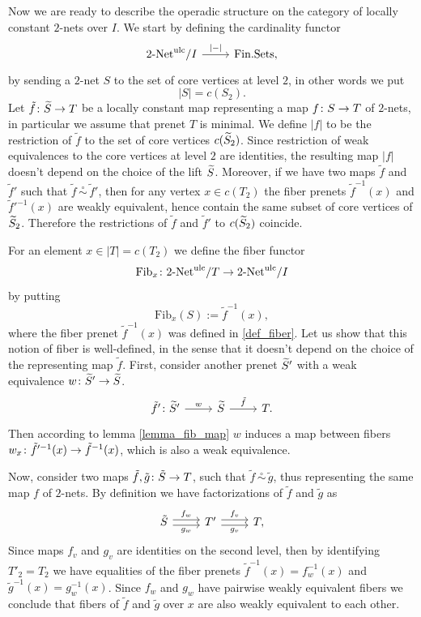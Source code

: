 \documentclass[letterpaper,12pt,leqno]{article}
\numberwithin{equation}{theorem}
\def\Fib{\mathrm{Fib}}
\def\Net{\textrm{-}\mathrm{Net}}
\def\simo{\,\mathop{\sim}\limits^\circ\,}
\def\ulc{\mathrm{ulc}}
\begin{document}
\begin{nparagraph}
Now we are ready to describe the operadic structure on the category of locally constant $2$-nets over $I$.
We start by defining the cardinality functor
$$
\begin{tikzcd}
2\Net^\ulc / I \ar[r, "|-|"] & \FSets,
\end{tikzcd}
$$
by sending a $2$-net $S$ to the set of core vertices at level $2$, in other words we put
$$
|S| = c(S_2).
$$
Let $\tilde f\colon \widetilde S \to T$ be a locally constant map representing a map $f\colon S \to T$ of $2$-nets, in particular we assume that prenet $T$ is minimal. We define
$|f|$ to be the restriction of $\tilde f$ to the set of core vertices $c(\widetilde S_2)$. Since restriction of weak equivalences to the core vertices at level $2$ are identities,
the resulting map $|f|$ doesn't depend on the choice of the lift $\widetilde S$. Moreover, if we have two maps $\tilde f$ and $\tilde f'$ such that $\tilde f \simo \tilde f'$, then
for any vertex $x \in c(T_2)$ the fiber prenets $\tilde f^{-1}(x)$ and $\tilde f'^{-1}(x)$ are weakly equivalent, hence contain the same subset of core vertices of $\widetilde S_2$.
Therefore the restrictions of $\tilde f$ and $\tilde f'$ to $c(\widetilde S_2)$ coincide.

For an element $x \in |T| = c(T_2)$ we define
the fiber functor
$$
\Fib_x \from 2\Net^\ulc / T \to 2\Net^\ulc / I
$$
by putting
$$
\Fib_x(S) := \tilde f^{-1}(x),
$$
where the fiber prenet $\tilde f^{-1}(x)$ was defined in \ref{def_fiber}. Let us show that this notion of fiber is well-defined, in the sense that it doesn't
depend on the choice of the representing map $\tilde f$. First, consider another prenet $\widetilde S'$ with a weak equivalence $w\colon \widetilde S' \to \widetilde S$.
$$
\begin{tikzcd}
\tilde f'\from \wtilde S' \ar[r, "w"] & \wtilde S \ar[r, "\tilde f"] & T.
\end{tikzcd}
$$
Then according to lemma \ref{lemma_fib_map} $w$ induces a map between fibers $w_x\colon \tilde f'^{-1}(x) \to \tilde f^{-1}(x)$, which is also a weak equivalence.

Now, consider two maps $\tilde f, \tilde g \colon \tilde S \to T$, such that $\tilde f \simo \tilde g$, thus representing the same map $f$ of $2$-nets.
By definition we have factorizations of $\tilde f$ and $\tilde g$ as
$$
\begin{tikzcd}
\tilde S \ar[shift left, r, "f_w"] \ar[shift right, r, "g_w"'] & T' \ar[shift left, r, "f_v"] \ar[shift right, r, "g_v"'] & T,
\end{tikzcd}
$$
Since maps $f_v$ and $g_v$ are identities on the second level, then by identifying $T'_2 = T_2$ we have equalities of the fiber prenets $\tilde f^{-1}(x) = f_w^{-1}(x)$
and $\tilde g^{-1}(x) = g_w^{-1}(x)$. Since $f_w$ and $g_w$ have pairwise weakly equivalent fibers we conclude that fibers of $\tilde f$ and $\tilde g$ over $x$ are also
weakly equivalent to each other.

\end{nparagraph}
\end{document}

